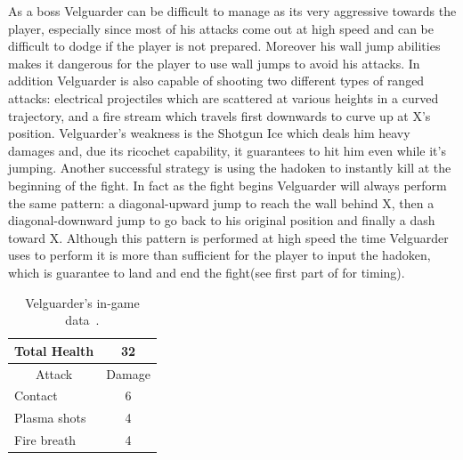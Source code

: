 As a boss Velguarder can be difficult to manage as its very aggressive towards the player, especially since most of his attacks come out at high speed and can be difficult to dodge if the player is not prepared. Moreover his wall jump abilities makes it dangerous for the player to use wall jumps to avoid his attacks. In addition Velguarder is also capable of shooting two different types of ranged attacks: electrical projectiles which are scattered at various heights in a curved trajectory, and a fire stream which travels first downwards to curve up at X's position. Velguarder's weakness is the Shotgun Ice which deals him heavy damages and, due its ricochet capability, it guarantees to hit him even while it's jumping. Another successful strategy is using the hadoken to instantly kill at the beginning of the fight. In fact as the fight begins Velguarder will always perform the same pattern: a diagonal-upward jump to reach the wall behind X, then a diagonal-downward jump to go back to his original position and finally a dash toward X. Although this pattern is performed at high speed the time Velguarder uses to perform it is more than sufficient for the player to input the hadoken, which is guarantee to land and end the fight(see first part of  for timing).

\begin{table}
	\centering
	\begin{tabular}[h]{l c}
		\toprule
		Total Health  & 32\\
		\midrule
		\multicolumn{1}{c}{Attack} & \multicolumn{1}{c}{Damage}\\
		Contact & 6\\
		Plasma shots& 4\\
		Fire breath& 4\\
		\bottomrule
	\end{tabular}
	\caption{Velguarder's in-game data~\cite{wiki:Velguarder}.}
\end{table}

